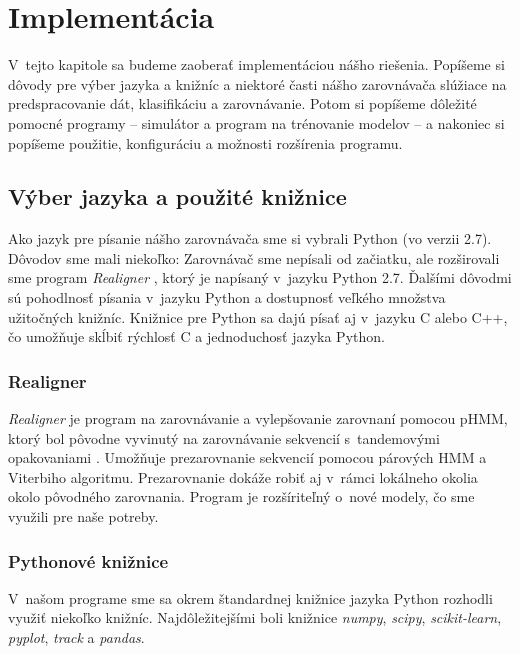 \chapter{Implementácia}
\label{chap:implementation}

V~tejto kapitole sa budeme zaoberať implementáciou nášho riešenia. Popíšeme si dôvody pre výber jazyka a knižníc a niektoré časti nášho zarovnávača slúžiace na predspracovanie dát, klasifikáciu a zarovnávanie. Potom si popíšeme dôležité pomocné programy -- simulátor a program na trénovanie modelov -- a nakoniec si popíšeme použitie, konfiguráciu a možnosti rozšírenia programu.

\section{Výber jazyka a použité knižnice}
Ako jazyk pre písanie nášho zarovnávača sme si vybrali Python (vo verzii 2.7). Dôvodov sme mali niekoľko: Zarovnávač sme nepísali od začiatku, ale rozširovali sme program \textit{Realigner} \cite{Nanasi2014}, ktorý je napísaný v~jazyku Python 2.7. Ďalšími dôvodmi sú pohodlnosť písania v~jazyku Python a dostupnosť veľkého množstva užitočných knižníc. Knižnice pre Python sa dajú písať aj v~jazyku C alebo C++, čo umožňuje skĺbiť rýchlosť C a jednoduchosť jazyka Python.

\subsection{Realigner}
\label{subsec:realigner}

\textit{Realigner} je program na zarovnávanie a vylepšovanie zarovnaní pomocou pHMM, ktorý bol pôvodne vyvinutý na zarovnávanie sekvencií s~tandemovými opakovaniami \cite{Nanasi2014}. Umožňuje prezarovnanie sekvencií pomocou párových HMM a Viterbiho algoritmu. Prezarovnanie dokáže robiť aj v~rámci lokálneho okolia okolo pôvodného zarovnania. Program je rozšíriteľný o~nové modely, čo sme využili pre naše potreby.

\subsection{Pythonové knižnice}
V~našom programe sme sa okrem štandardnej knižnice jazyka Python rozhodli využiť niekoľko knižníc. Najdôležitejšími boli knižnice \textit{numpy}, \textit{scipy}, \textit{scikit-learn}, \textit{pyplot}, \textit{track} a \textit{pandas}.

